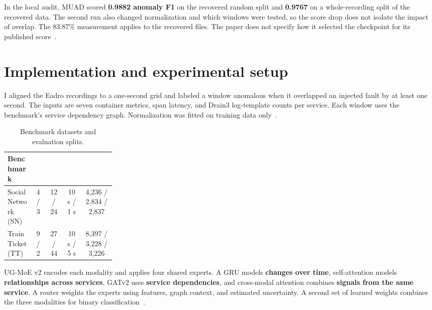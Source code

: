\documentclass[11pt,a4paper,onecolumn]{IEEEtran}
\begin{document}
In the local audit, MUAD scored \textbf{0.9882 anomaly F1} on the recovered random split and \textbf{0.9767}
on a whole-recording split of the recovered data. The second run also changed normalization and which
windows were tested, so the score drop does not isolate the impact of overlap. The 83.87\% measurement
applies to the recovered files. The paper does not specify how it selected the checkpoint for its published
score~\cite{muad-paper,muad-audit}.

\section{Implementation and experimental setup}

I aligned the Eadro recordings to a one-second grid and labeled a window anomalous when it overlapped an
injected fault by at least one second. The inputs are seven container metrics, span latency, and Drain3
log-template counts per service. Each window uses the benchmark's service dependency graph. Normalization
was fitted on training data only~\cite{eadro,implementation-report}.

\begin{table}[H]
\centering
\small
\setlength{\tabcolsep}{4pt}
\renewcommand{\arraystretch}{1.18}
\caption{Benchmark datasets and evaluation splits.}
\begin{tabular}{@{}P{0.25\linewidth}cccc@{}}
\toprule
\textbf{Benchmark} & \textbf{} & \textbf{} & \textbf{} & \textbf{} \\
\midrule
SocialNetwork (SN) &
  4 / 3 &
  12 / 24 &
  10 s / 1 s &
  4,236 / 2,834 / 2,837 \\
TrainTicket (TT) &
  9 / 2 &
  27 / 44 &
  10 s / 5 s &
  8,397 / 3,228 / 3,226 \\
\bottomrule
\end{tabular}
\end{table}

UG-MoE v2 encodes each modality and applies four shared experts. A GRU models \textbf{changes over time},
self-attention models \textbf{relationships across services}, GATv2 uses \textbf{service dependencies}, and
cross-modal attention combines \textbf{signals from the same service}. A router weights the experts using
features, graph context, and estimated uncertainty. A second set of learned weights combines the three
modalities for binary classification~\cite{implementation-report}.
\end{document}
